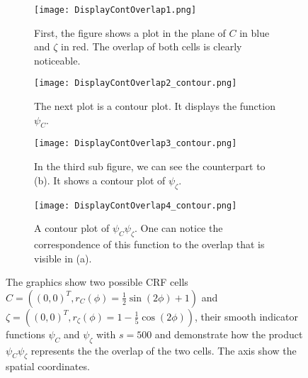 \documentclass[a4paper,12pt,leqno]{article}
\theoremstyle{plain}
\theoremstyle{remark}
\begin{document}
\begin{figure}[]
	\centering
	\begin{subfigure}{0.45\textwidth}
		\texttt{[image: DisplayContOverlap1.png]}
		\caption{First, the figure shows a plot in the plane of $C$ in blue and $\zeta$ in red. The overlap of both cells is clearly noticeable.}
	\end{subfigure}
	\hfill
	\begin{subfigure}{0.45\textwidth}
		\texttt{[image: DisplayContOverlap2\_contour.png]}
		\caption{The next plot is a contour plot. It displays the function $\psi_{C}$. \\ }
	\end{subfigure}
	\hfill
	\begin{subfigure}{0.45\textwidth}
		\texttt{[image: DisplayContOverlap3\_contour.png]}
		\caption{In the third sub figure, we can see the counterpart to (b). It shows a contour plot of $\psi_{\zeta}$. }
	\end{subfigure}
	\hfill
	\begin{subfigure}{0.45\textwidth}
		\texttt{[image: DisplayContOverlap4\_contour.png]}
		\caption{A contour plot of $\psi_{C} \psi_{\zeta}$. One can notice the correspondence of this function to the overlap that is visible in (a).}
	\end{subfigure}
	\hfill
	\caption{The graphics show two possible CRF cells $C = ((0, 0)^T, r_{C}(\phi) = \frac{1}{2}\sin(2\phi) + 1)$ and $\zeta = ((0, 0)^T, r_{\zeta}(\phi) = 1 - \frac{1}{5}\cos(2\phi))$, their smooth indicator functions $\psi_{C}$ and $\psi_{\zeta}$ with $s=500$ and demonstrate how the product $\psi_{C}\psi_{\zeta}$ represents the the overlap of the two cells. The axis show the spatial coordinates. }
	\label{fig:contOverlap}
\end{figure}
\end{document}
